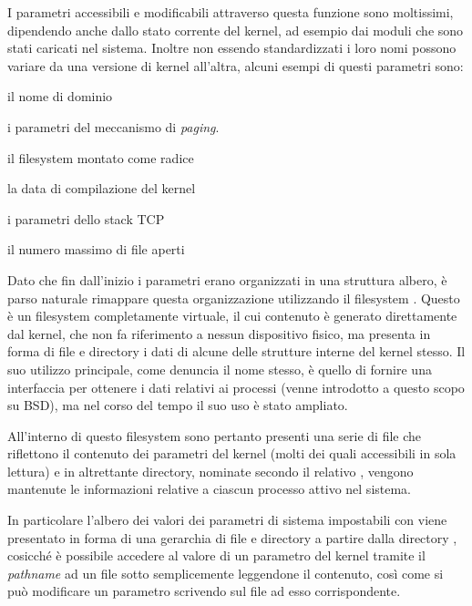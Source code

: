 I parametri accessibili e modificabili attraverso questa funzione sono
moltissimi, dipendendo anche dallo stato corrente del kernel, ad esempio dai
moduli che sono stati caricati nel sistema. Inoltre non essendo standardizzati
i loro nomi possono variare da una versione di kernel all'altra, alcuni esempi
di questi parametri sono:
\begin{itemize*}
\item il nome di dominio
\item i parametri del meccanismo di \textit{paging}.
\item il filesystem montato come radice
\item la data di compilazione del kernel
\item i parametri dello stack TCP
\item il numero massimo di file aperti
\end{itemize*}




Dato che fin dall'inizio i parametri erano organizzati in una struttura
albero, è parso naturale rimappare questa organizzazione utilizzando il
filesystem . Questo è un filesystem completamente virtuale, il cui
contenuto è generato direttamente dal kernel, che non fa riferimento a nessun
dispositivo fisico, ma presenta in forma di file e directory i dati di alcune
delle strutture interne del kernel stesso. Il suo utilizzo principale, come
denuncia il nome stesso, è quello di fornire una interfaccia per ottenere i
dati relativi ai processi (venne introdotto a questo scopo su BSD), ma nel
corso del tempo il suo uso è stato ampliato.

All'interno di questo filesystem sono pertanto presenti una serie di file che
riflettono il contenuto dei parametri del kernel (molti dei quali accessibili
in sola lettura) e in altrettante directory, nominate secondo il relativo
, vengono mantenute le informazioni relative a ciascun processo
attivo nel sistema.

In particolare l'albero dei valori dei parametri di sistema impostabili con
 viene presentato in forma di una gerarchia di file e directory a
partire dalla directory , cosicché è possibile accedere al
valore di un parametro del kernel tramite il \textit{pathname} ad un file
sotto  semplicemente leggendone il contenuto, così come si può
modificare un parametro scrivendo sul file ad esso corrispondente.

